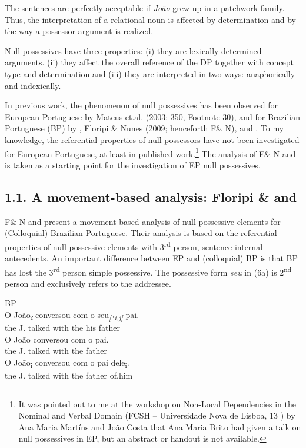 \documentclass[output=paper]{langsci/langscibook}
\begin{document}
The sentences are perfectly acceptable if \textit{João} grew up in a patchwork family. Thus, the interpretation of a relational noun is affected by determination and by the way a possessor argument is realized.

Null possessives have three properties: (i) they are lexically determined arguments. (ii) they affect the overall reference of the DP together with concept type and determination and (iii) they are interpreted in two ways: anaphorically and indexically.

In previous work, the phenomenon of null possessives has been observed for European Portuguese by Mateus et.al. (2003: 350, Footnote 30), and for Brazilian Portuguese (BP) by \citet{Floripi2003}, Floripi \& Nunes (2009; henceforth F\& N), and \citet{Rodrigues2010}. To my knowledge, the referential properties of null possessors have not been investigated for European Portuguese, at least in published work.\footnote{It was pointed out to me at the workshop on Non-Local Dependencies in the Nominal and Verbal Domain (FCSH – Universidade Nova de Lisboa, 13 \citealt{November2015}) by Ana Maria Martíns and João Costa that Ana Maria Brito had given a talk on null possessives in EP, but an abstract or handout is not available.} The analysis of F\& N and \citet{Rodrigues2010} is taken as a starting point for the investigation of EP null possessives.

\subsection{ 1.1. A movement-based analysis: Floripi \& \citet{Nunes2009} and \citet{Rodrigues2010}}

F\& N and \citet{Rodrigues2010} present a movement-based analysis of null possessive elements for (Colloquial) Brazilian Portuguese. Their analysis is based on the referential properties of null possessive elements with 3\textsuperscript{rd} person, sentence-internal antecedents. An important difference between EP and (colloquial) BP is that BP has lost the 3\textsuperscript{rd} person simple possessive. The possessive form \textit{seu} in (6a) is 2\textsuperscript{nd} person and exclusively refers to the addressee.

\ea%
    BP\label{ex:wein:6}\\
    \ea
    \gll O João\textit{\textsubscript{i}} conversou com o   seu\textit{\textsubscript{[*i,j]}} pai.\\
         the J.   talked   with the his   father\\
    \ex  
    \gll O João conversou com o pai.\\
         the J. talked with the father\\
    \ex  
    \gll O João\textsubscript{i} conversou com o pai dele\textsubscript{i}.\\
         the J.   talked with the father of.him\\
    \z
\z
\end{document}
